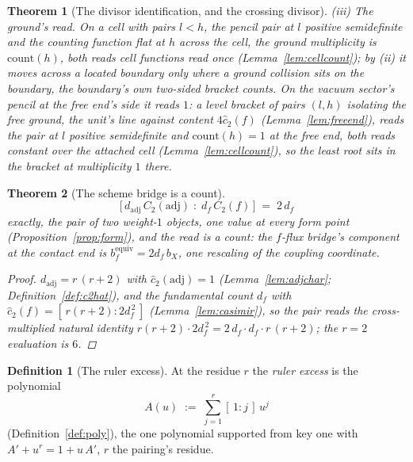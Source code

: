 \documentclass[11pt]{article}
\newtheorem{theorem}{Theorem}
\theoremstyle{definition}
\newtheorem{definition}{Definition}
\begin{document}
\begin{theorem}[The divisor identification, and the crossing divisor]
\emph{(iii) The ground's read.} On a cell with pairs $l<h$,
the pencil pair at $l$ positive semidefinite and the counting
function flat at $h$
across the cell, the ground multiplicity is
$\mathrm{count}(h)$, both reads cell functions read
once (Lemma~\ref{lem:cellcount}); by (ii) it moves across a located
boundary only where a ground collision sits on the boundary, the
boundary's own two-sided bracket counts. On the vacuum sector's
pencil at the free end's side it reads $1$: a level
bracket of pairs $(l,h)$ isolating the free ground, the unit's line
against content $4\hat c_2(f)$ (Lemma~\ref{lem:freeend}), reads
the pair at $l$ positive semidefinite and $\mathrm{count}(h)=1$
at the free end, both reads
constant over the attached cell (Lemma~\ref{lem:cellcount}), so the
least root sits in the bracket at multiplicity $1$ there.
\end{theorem}

\begin{theorem}[The scheme bridge is a count]\label{thm:bridge}
\[
\big[\,d_{\mathrm{adj}}\,C_2(\mathrm{adj})\;:\;d_f\,C_2(f)\,\big]
\;=\;2\,d_f
\]
exactly, the pair of two weight-$1$ objects, one value at every form
point
(Proposition~\ref{prop:form}), and the read is a count: the $f$-flux
bridge's component at the contact end is
$b_f^{\mathrm{equiv}}=2d_f\,b_X$, one
rescaling of the coupling coordinate.
\begin{proof}
$d_{\mathrm{adj}}=r\,(r+2)$ with $\hat c_2(\mathrm{adj})=1$
(Lemma~\ref{lem:adjchar}; Definition~\ref{def:c2hat}), and the fundamental
count $d_f$ with
$\hat c_2(f)=[\,r(r+2):2d_f^{\,2}\,]$ (Lemma~\ref{lem:casimir}), so
the pair reads the cross-multiplied natural identity
$r(r+2)\cdot2d_f^{\,2}=2\,d_f\cdot d_f\cdot r\,(r+2)$; the $r=2$
evaluation is $6$.
\end{proof}
\end{theorem}

\begin{definition}[The ruler excess]\label{def:excess}
At the residue $r$ the \emph{ruler excess} is the polynomial
\[
A(u)\;:=\;\sum_{j=1}^{r}[\,1:j\,]\,u^j
\]
(Definition~\ref{def:poly}), the one polynomial supported from
key one with $A'+u^r=1+u\,A'$, $r$ the pairing's residue.
\end{definition}
\end{document}
